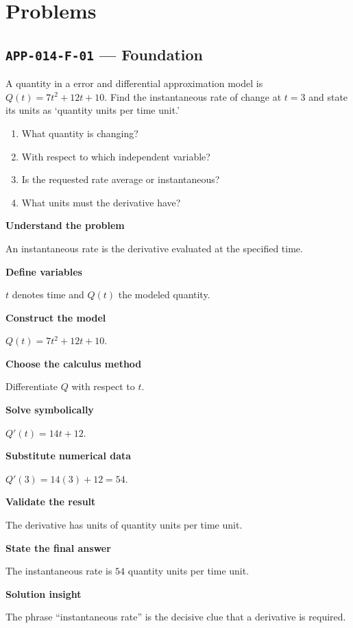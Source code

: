 \documentclass[11pt]{book}
\newcommand{\pid}[1]{\texttt{#1}}
\begin{document}
\section*{Problems}
\subsection*{\pid{APP-014-F-01} — Foundation}
\begin{problembox}
A quantity in a error and differential approximation model is $Q(t)=7t^2+12t+10$. Find the instantaneous rate of change at $t=3$ and state its units as ‘quantity units per time unit.’
\end{problembox}
\begin{promptbox}\begin{enumerate}
\item What quantity is changing?
\item With respect to which independent variable?
\item Is the requested rate average or instantaneous?
\item What units must the derivative have?
\end{enumerate}\end{promptbox}
\begin{solutionbox}
\textbf{Understand the problem}\par An instantaneous rate is the derivative evaluated at the specified time.\par\medskip
\textbf{Define variables}\par $t$ denotes time and $Q(t)$ the modeled quantity.\par\medskip
\textbf{Construct the model}\par $Q(t)=7t^2+12t+10$.\par\medskip
\textbf{Choose the calculus method}\par Differentiate $Q$ with respect to $t$.\par\medskip
\textbf{Solve symbolically}\par $Q'(t)=14t+12$.\par\medskip
\textbf{Substitute numerical data}\par $Q'(3)=14(3)+12=54$.\par\medskip
\textbf{Validate the result}\par The derivative has units of quantity units per time unit.\par\medskip
\textbf{State the final answer}\par The instantaneous rate is $54$ quantity units per time unit.\par\medskip
\textbf{Solution insight}\par The phrase “instantaneous rate” is the decisive clue that a derivative is required.\par\medskip
\end{solutionbox}
\end{document}
